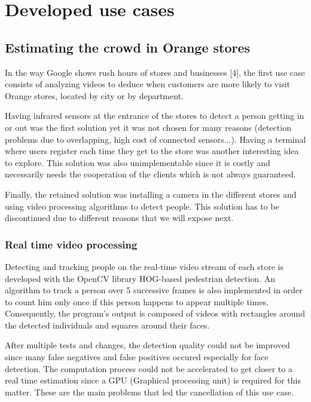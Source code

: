 \documentclass[11pt]{article}
\begin{document}
\section{Developed use cases}
\subsection{Estimating the crowd in Orange stores}

In the way \textsf{Google} shows rush hours of stores and businesses [4], the first use case consists of analyzing videos to deduce when customers are more likely to visit \textsf{Orange} stores, located by city or by department.

Having infrared sensors at the entrance of the stores to detect a person getting in or out was the first solution yet it was not chosen for many reasons (detection problems due to overlapping, high cost of connected sensors...).
Having a terminal where users register each time they get to the store was another interesting idea to explore. This solution was also unimplementable since it is costly and necessarily needs the cooperation of the clients which is not always guaranteed. 

Finally, the retained solution was installing a camera in the different stores and using video processing algorithms to detect people. This solution has to be discontinued due to different reasons that we will expose next.

\subsubsection{Real time video processing}

Detecting and tracking people on the real-time video stream of each store is developed with the \textsf{OpenCV} library HOG-based pedestrian detection. An algorithm to track a person over 5 successive frames is also implemented in order to count him only once if this person happens to appear multiple times. Consequently, the program's output is composed of videos with rectangles around the detected individuals and squares around their faces. 

After multiple tests and changes, the detection quality could not be improved since many false negatives and false positives occured especially for face detection. The computation process could not be accelerated to get closer to a real time estimation since a GPU (Graphical processing unit) is required for this matter. These are the main problems that led the cancellation of this use case.
\end{document}
